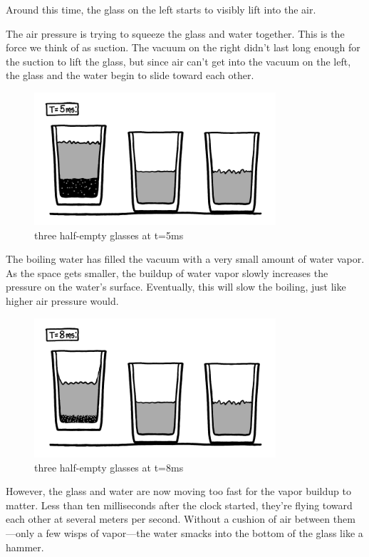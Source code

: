 {Around this time, the glass on the left starts to visibly lift into the air.}

{The air pressure is trying to squeeze the glass and water together. This is the force we think of as suction. The vacuum on the right didn’t last long enough for the suction to lift the glass, but since air can’t get into the vacuum on the left, the glass and the water begin to slide toward each other.}

\begin{figure}[!htbp]
\centering
\includegraphics[scale=0.5, max width=0.8\textwidth]{imgs/a/6/glass_5ms.png}
\caption{three half-empty glasses at t=5ms}
\end{figure}

{The boiling water has filled the vacuum with a very small amount of water vapor. As the space gets smaller, the buildup of water vapor slowly increases the pressure on the water’s surface. Eventually, this will slow the boiling, just like higher air pressure would.}

\begin{figure}[!htbp]
\centering
\includegraphics[scale=0.5, max width=0.8\textwidth]{imgs/a/6/glass_8ms.png}
\caption{three half-empty glasses at t=8ms}
\end{figure}

{However, the glass and water are now moving too fast for the vapor buildup to matter. Less than ten milliseconds after the clock started, they’re flying toward each other at several meters per second. Without a cushion of air between them—only a few wisps of vapor—the water smacks into the bottom of the glass like a hammer.}

